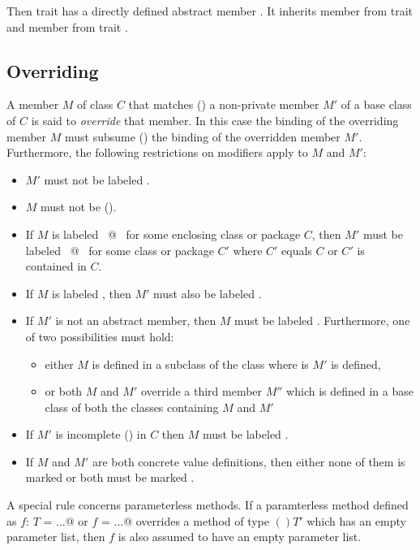 Then trait  has a directly defined abstract member . It
inherits member  from trait  and member  from
trait .

\subsection{Overriding}
\label{sec:overriding}


A member $M$ of class $C$ that matches () 
a non-private member $M'$ of a
base class of $C$ is said to {\em override} that member.  In this case
the binding of the overriding member $M$ must subsume
() the binding of the overridden member $M'$.
Furthermore, the following restrictions on modifiers apply to $M$ and
$M'$:
\begin{itemize}
\item
$M'$ must not be labeled .
\item
$M$ must not be  ().
\item
If $M$ is labeled ~\lstinline@private[$C$]@~ for some enclosing class or package $C$,
then $M'$ must be labeled ~\lstinline@private[$C'$]@~ for some class or package $C'$ where
$C'$ equals $C$ or $C'$ is contained in $C$. 
\item
If $M$ is labeled , then $M'$ must also be
labeled .
\item
If $M'$ is not an abstract member, then
$M$ must be labeled .
Furthermore, one of two possibilities must hold:
\begin{itemize}
\item either $M$ is defined in a subclass of the class where is $M'$ is defined, 
\item or both $M$ and $M'$ override a third member $M''$ which is defined
      in a base class of both the classes containing $M$ and $M'$ 
\end{itemize}
\item
If $M'$ is incomplete () in $C$ then $M$ must be
labeled .
\item 
If $M$ and $M'$ are both concrete value definitions, then either none
of them is marked  or both must be marked .
\end{itemize}
A special rule concerns parameterless methods. If a paramterless
method defined as \lstinline@def $f$: $T$ = ...@ or 
\lstinline@def $f$ = ...@ overrides a method of
type $()T'$ which has an empty parameter list, then $f$ is also
assumed to have an empty parameter list.

